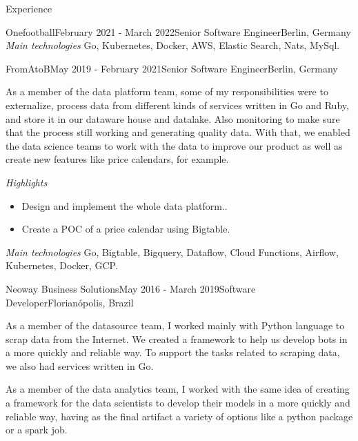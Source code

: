 \documentclass[
	a4paper, %
	10pt, %
]{resume} %
\begin{document}
\begin{rSection}{Experience}
\begin{rSubsection}{Onefootball}{February 2021 - March 2022}{Senior Software Engineer}{Berlin, Germany}
		\textit{Main technologies}
			Go, Kubernetes, Docker, AWS, Elastic Search, Nats, MySql.

	\end{rSubsection}

	\vspace{1mm}

	\begin{rSubsection}{FromAtoB}{May 2019 - February 2021}{Senior Software Engineer}{Berlin, Germany}
		\item[]
		As a member of the data platform team, some of my responsibilities were to externalize, process data from different kinds of services written in Go and Ruby,
		and store it in our dataware house and datalake.
		Also monitoring to make sure that the process still working and generating quality data.
		With that, we enabled the data science teams to work with the data to improve our product as well as create new features like price calendars, for example.


		\textit{Highlights}
		\begin{itemize}
			\item Design and implement the whole data platform..
			\item Create a POC of a price calendar using Bigtable.
		\end{itemize}

		\textit{Main technologies}
			Go, Bigtable, Bigquery, Dataflow, Cloud Functions, Airflow, Kubernetes, Docker, GCP.


	\end{rSubsection}

	\vspace{1mm}

	\begin{rSubsection}{Neoway Business Solutions}{May 2016 - March 2019}{Software Developer}{Florianópolis, Brazil}
		\item As a member of the datasource team, I worked mainly with Python language to scrap data from the Internet. We created a framework to help us develop bots in a more quickly and reliable way.
To support the tasks related to scraping data, we also had services written in Go.


As a member of the data analytics team, I worked with the same idea of creating a framework for the data scientists to develop their models in a more quickly and reliable way, having as the final artifact a variety of options like a python package or a spark job.



\end{rSubsection}
\end{rSection}
\end{document}
